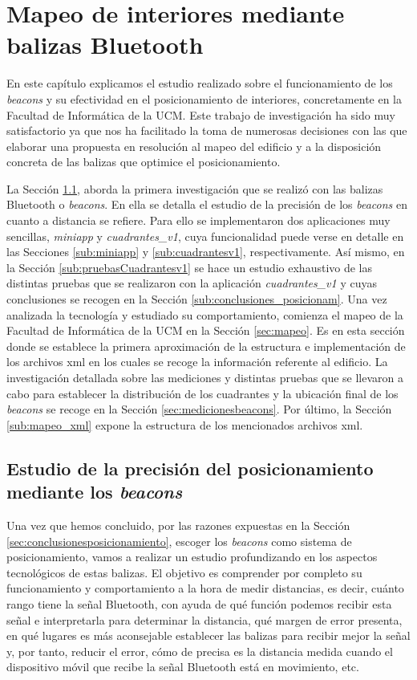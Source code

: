 \chapter{Mapeo de interiores mediante balizas Bluetooth}
\label{cap:descripcionTrabajo}

En este capítulo explicamos el estudio realizado sobre el funcionamiento de los \textit{beacons} y su efectividad en el posicionamiento de interiores, concretamente en la Facultad de Informática de la UCM. Este trabajo de investigación ha sido muy satisfactorio ya que nos ha facilitado la toma de numerosas decisiones con las que elaborar una propuesta en resolución al mapeo del edificio y a la disposición concreta de las balizas que optimice el posicionamiento. 

La Sección \ref{sec:estudioPrecisionBeacons}, aborda la primera investigación que se realizó con las balizas Bluetooth o \textit{beacons}. En ella se detalla el estudio de la precisión de los \textit{beacons} en cuanto a distancia se refiere. Para ello se implementaron dos aplicaciones muy sencillas, \textit{miniapp} y \textit{cuadrantes\_v1}, cuya funcionalidad puede verse en detalle en las Secciones \ref{sub:miniapp} y \ref{sub:cuadrantesv1}, respectivamente. Así mismo, en la Sección \ref{sub:pruebasCuadrantesv1} se hace un estudio exhaustivo de las distintas pruebas que se realizaron con la aplicación \textit{cuadrantes\_v1} y cuyas conclusiones se recogen en la Sección \ref{sub:conclusiones_posicionam}. Una vez analizada la tecnología y estudiado su comportamiento, comienza el mapeo de la Facultad de Informática de la UCM en la Sección \ref{sec:mapeo}. Es en esta sección donde se establece la primera aproximación de la estructura e implementación de los archivos xml en los cuales se recoge la información referente al edificio. La investigación detallada sobre las mediciones y distintas pruebas que se llevaron a cabo para establecer la distribución de los cuadrantes y la ubicación final de los \textit{beacons} se recoge en la Sección \ref{sec:medicionesbeacons}. Por último, la Sección \ref{sub:mapeo_xml} expone la estructura de los mencionados archivos xml.


\section{Estudio de la precisión del posicionamiento mediante los \textit{beacons}}
\label{sec:estudioPrecisionBeacons}

Una vez que hemos concluido, por las razones expuestas en la Sección \ref{sec:conclusionesposicionamiento}, escoger los \textit{beacons} como sistema de posicionamiento, vamos a realizar un estudio profundizando en los aspectos tecnológicos de estas balizas. El objetivo es comprender por completo su funcionamiento y comportamiento a la hora de medir distancias, es decir, cuánto rango tiene la señal Bluetooth, con ayuda de qué función podemos recibir esta señal e interpretarla para determinar la distancia, qué margen de error presenta, en qué lugares es más aconsejable establecer las balizas para recibir mejor la señal y, por tanto, reducir el error, cómo de precisa es la distancia medida cuando el dispositivo móvil que recibe la señal Bluetooth está en movimiento, etc. 

